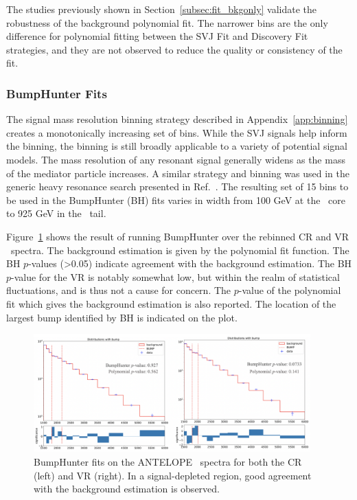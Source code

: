 The studies previously shown in Section~\ref{subsec:fit_bkgonly} validate the robustness of the background polynomial fit. 
The narrower bins are the only difference for polynomial fitting between the SVJ Fit and Discovery Fit strategies, and they are not observed to reduce the quality or consistency of the fit. 

\subsubsection{BumpHunter Fits}
\label{subsec:bhfits}

The signal mass resolution binning strategy described in Appendix~\ref{app:binning} creates a monotonically increasing set of bins. 
While the SVJ signals help inform the binning, the binning is still broadly applicable to a variety of potential signal models.
The mass resolution of any resonant signal generally widens as the mass of the mediator particle increases.
A similar strategy and binning was used in the generic heavy resonance search presented in Ref.~\cite{yxh}.
The resulting set of 15 bins to be used in the BumpHunter (BH) fits varies in width from 100 GeV at the \mt~core to 925 GeV in the \mt~tail. 

Figure~\ref{fig:antelope_bh_crvr} shows the result of running BumpHunter over the rebinned CR and VR \mt~spectra.
The background estimation is given by the polynomial fit function. 
The BH $p$-values (>0.05) indicate agreement with the background estimation.
The BH $p$-value for the VR is notably somewhat low, but within the realm of statistical fluctuations, and is thus not a cause for concern.
The $p$-value of the polynomial fit which gives the background estimation is also reported.
The location of the largest bump identified by BH is indicated on the plot. 
\begin{figure}[!htbp]
\centering
   \includegraphics[width=0.95\textwidth]{figures/stats/antelope_bh_crvr}
    \caption{BumpHunter fits on the ANTELOPE \mt~spectra for both the CR (left) and VR (right). In a signal-depleted region, good agreement with the background estimation is observed.
    \label{fig:antelope_bh_crvr}}
\end{figure}

